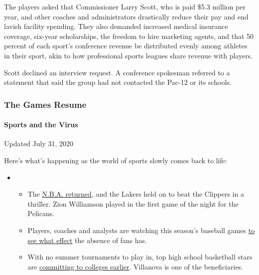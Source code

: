 The players asked that Commissioner Larry Scott, who is paid \$5.3
million per year, and other coaches and administrators drastically
reduce their pay and end lavish facility spending. They also demanded
increased medical insurance coverage, six-year scholarships, the freedom
to hire marketing agents, and that 50 percent of each sport's conference
revenue be distributed evenly among athletes in their sport, akin to how
professional sports leagues share revenue with players.

Scott declined an interview request. A conference spokesman referred to
a statement that said the group had not contacted the Pac-12 or its
schools.

\hypertarget{the-games-resume}{%
\subsubsection{The Games Resume}\label{the-games-resume}}

\hypertarget{sports-and-the-virus}{%
\paragraph{Sports and the Virus}\label{sports-and-the-virus}}

Updated July 31, 2020

Here's what's happening as the world of sports slowly comes back to
life:

\begin{itemize}
\item
  \begin{itemize}
  \tightlist
  \item
    The
    \href{https://www.nytimes.com/2020/07/30/sports/basketball/clippers-lakers.html?action=click\&pgtype=Article\&state=default\&region=MAIN_CONTENT_2\&context=storylines_keepup}{N.B.A.
    returned}, and the Lakers held on to beat the Clippers in a
    thriller. Zion Williamson played in the first game of the night for
    the Pelicans.
  \item
    Players, coaches and analysts are watching this season's baseball
    games
    \href{https://www.nytimes.com/2020/07/31/sports/baseball/baseball-empty-stadiums-effects.html?action=click\&pgtype=Article\&state=default\&region=MAIN_CONTENT_2\&context=storylines_keepup}{to
    see what effect} the absence of fans has.
  \item
    With no summer tournaments to play in, top high school basketball
    stars are
    \href{https://www.nytimes.com/2020/07/30/sports/ncaabasketball/college-basketball-recruiting.html?action=click\&pgtype=Article\&state=default\&region=MAIN_CONTENT_2\&context=storylines_keepup}{committing
    to colleges earlier}. Villanova is one of the beneficiaries.
  \end{itemize}
\end{itemize}

